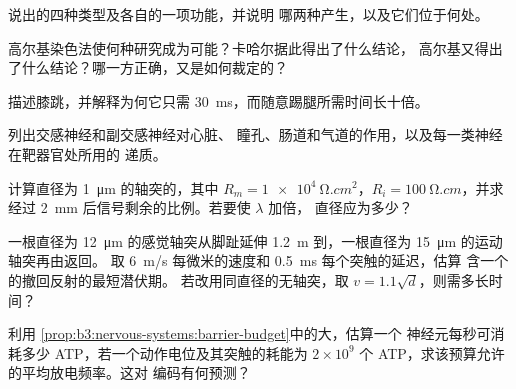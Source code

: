 \begin{exercise}[$\star$]\label{exo:b3:nervous-systems:1}
说出的四种类型及各自的一项功能，并说明
哪两种产生，以及它们位于何处。
\end{exercise}

\begin{exercise}[$\star$]\label{exo:b3:nervous-systems:2}
高尔基染色法使何种研究成为可能？卡哈尔据此得出了什么结论，
高尔基又得出了什么结论？哪一方正确，又是如何裁定的？
\end{exercise}

\begin{exercise}[$\star$]\label{exo:b3:nervous-systems:3}
描述膝跳，并解释为何它只需
\qty{30}{ms}，而随意踢腿所需时间长十倍。
\end{exercise}

\begin{exercise}[$\star$]\label{exo:b3:nervous-systems:4}
列出交感神经和副交感神经对心脏、
瞳孔、肠道和气道的作用，以及每一类神经在靶器官处所用的
递质。
\end{exercise}

\begin{exercise}[$\star\star$]\label{exo:b3:nervous-systems:5}
计算直径为 \qty{1}{\micro m} 的轴突的，其中 $R_{m}
= \qty{1e4}{\ohm.cm^2}$，$R_{i} = \qty{100}{\ohm.cm}$，并求经过
\qty{2}{mm} 后信号剩余的比例。若要使 $\lambda$ 加倍，
直径应为多少？
\end{exercise}

\begin{exercise}[$\star\star$]\label{exo:b3:nervous-systems:6}
一根直径为 \qty{12}{\micro m} 的感觉轴突从脚趾延伸 \qty{1.2}{m}
到，一根直径为 \qty{15}{\micro m} 的运动轴突再由返回。
取 \qty{6}{m/s} 每微米的速度和 \qty{0.5}{ms} 每个突触的延迟，估算
含一个的撤回反射的最短潜伏期。
若改用同直径的无轴突，取
$v = 1.1\sqrt{d}$，则需多长时间？
\end{exercise}

\begin{exercise}[$\star\star$]\label{exo:b3:nervous-systems:7}
利用
\cref{prop:b3:nervous-systems:barrier-budget}中的大，估算一个
神经元每秒可消耗多少 ATP，若一个动作电位及其突触的耗能为
$2\times 10^{9}$ 个 ATP，求该预算允许的平均放电频率。这对
编码有何预测？
\end{exercise}

